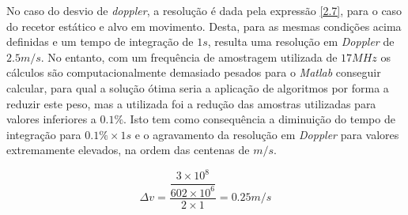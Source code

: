 No caso do desvio de \textit{doppler}, a resolução é dada pela expressão \ref{2.7}, para o caso do recetor estático e alvo em movimento. Desta, para as mesmas condições acima definidas e um tempo de integração de $1 s$, resulta uma resolução em \textit{Doppler} de $2.5 m/s$. No entanto, com um frequência de amostragem utilizada de $17 MHz$ os cálculos são computacionalmente demasiado pesados para o \textit{Matlab} conseguir calcular, para qual a solução ótima seria a aplicação de algoritmos por forma a reduzir este peso, mas a utilizada foi a redução das amostras utilizadas para valores inferiores a $0.1\% $. Isto tem como consequência a diminuição do tempo de integração para $0.1\% \times 1s$ e o agravamento da resolução em \textit{Doppler} para valores extremamente elevados, na ordem das centenas de $m/s$.

\begin{equation} \label{5.2}
\Delta v = \dfrac{\dfrac{3\times 10^{8}}{602\times 10^{6}}}{2\times 1} = 0.25 m/s
\end{equation}




